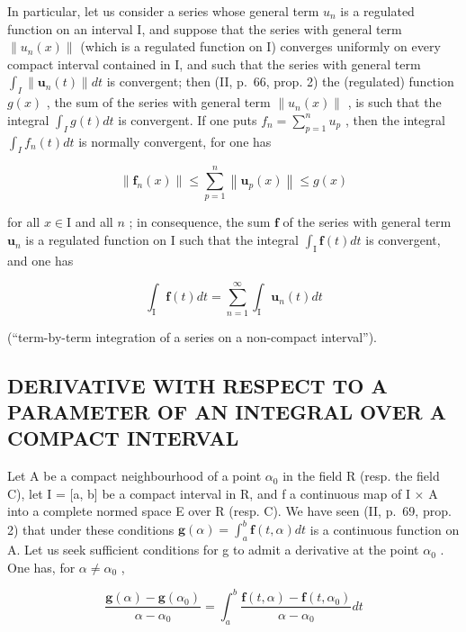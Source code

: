 In particular, let us consider a series whose general term \(u_{n}\) is a regulated function on an interval I, and suppose that the series with general term \(\|u_{n}(x)\|\) (which is a regulated function on I) converges uniformly on every compact interval contained in I, and such that the series with general term \(\int_{I}\|\mathbf{u}_{n}(t)\|dt\) is convergent; then (II, p.~66, prop. 2) the (regulated) function \(g(x)\) , the sum of the series with general term \(\|u_{n}(x)\|\) , is such that the integral \(\int_{I}g(t)dt\) is convergent. If one puts \(f_{n}=\sum_{p=1}^{n}u_{p}\) , then the integral \(\int_{I}f_{n}(t)dt\) is normally convergent, for one has

\[
\left\| \mathbf {f} _ {n} (x) \right\| \leqslant \sum_ {p = 1} ^ {n} \left\| \mathbf {u} _ {p} (x) \right\| \leqslant g (x)
\]

for all \(x \in \mathrm{I}\) and all \(n\) ; in consequence, the sum \(\mathbf{f}\) of the series with general term \(\mathbf{u}_n\) is a regulated function on \(\mathrm{I}\) such that the integral \(\int_{\mathrm{I}} \mathbf{f}(t) dt\) is convergent, and one has

\[
\int_ {\mathrm{I}} \mathbf {f} (t) d t = \sum_ {n = 1} ^ {\infty} \int_ {\mathrm{I}} \mathbf {u} _ {n} (t) d t\tag{11}
\]

(``term-by-term integration of a series on a non-compact interval'').

\subsection{DERIVATIVE WITH RESPECT TO A PARAMETER OF AN INTEGRAL OVER A COMPACT INTERVAL}

Let A be a compact neighbourhood of a point \(\alpha_{0}\) in the field R (resp. the field C), let I = {[}a, b{]} be a compact interval in R, and f a continuous map of I × A into a complete normed space E over R (resp. C). We have seen (II, p.~69, prop. 2) that under these conditions \(\mathbf{g}(\alpha) = \int_{a}^{b} \mathbf{f}(t, \alpha) dt\) is a continuous function on A. Let us seek sufficient conditions for g to admit a derivative at the point \(\alpha_{0}\) . One has, for \(\alpha \neq \alpha_{0}\) ,

\[
\frac {\mathbf {g} (\alpha) - \mathbf {g} (\alpha_ {0})}{\alpha - \alpha_ {0}} = \int_ {a} ^ {b} \frac {\mathbf {f} (t , \alpha) - \mathbf {f} (t , \alpha_ {0})}{\alpha - \alpha_ {0}} d t
\]

